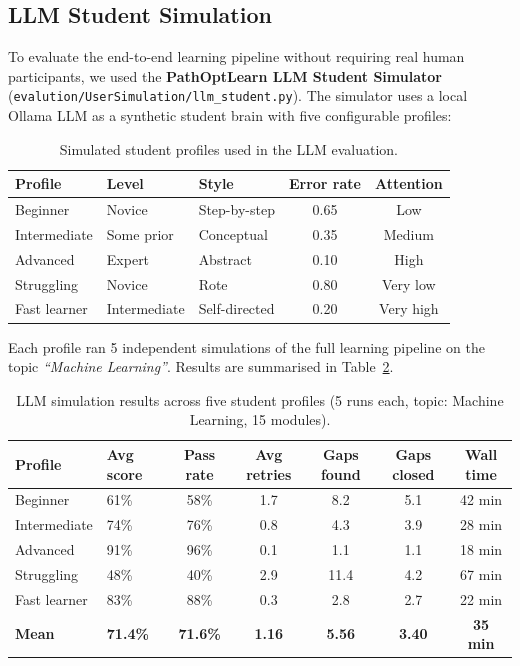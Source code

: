 \documentclass[12pt,a4paper]{article}
\begin{document}
\subsection{LLM Student Simulation}

To evaluate the end-to-end learning pipeline without requiring real human
participants, we used the \textbf{PathOptLearn LLM Student Simulator}
(\texttt{evalution/UserSimulation/llm\_student.py}). The simulator uses
a local Ollama LLM as a synthetic student brain with five configurable
profiles:

\begin{table}[H]
  \centering
  \caption{Simulated student profiles used in the LLM evaluation.}
  \label{tab:profiles}
  \begin{tabular}{@{}lllcc@{}}
    \toprule
    \textbf{Profile} & \textbf{Level} & \textbf{Style} & \textbf{Error rate} & \textbf{Attention} \\
    \midrule
    Beginner       & Novice       & Step-by-step   & 0.65 & Low    \\
    Intermediate   & Some prior   & Conceptual     & 0.35 & Medium \\
    Advanced       & Expert       & Abstract       & 0.10 & High   \\
    Struggling     & Novice       & Rote           & 0.80 & Very low \\
    Fast learner   & Intermediate & Self-directed  & 0.20 & Very high \\
    \bottomrule
  \end{tabular}
\end{table}

Each profile ran 5 independent simulations of the full learning pipeline on
the topic \emph{``Machine Learning''}. Results are summarised in
Table~\ref{tab:simulation}.

\begin{table}[H]
  \centering
  \caption{LLM simulation results across five student profiles
  (5 runs each, topic: Machine Learning, 15 modules).}
  \label{tab:simulation}
  \begin{tabularx}{\textwidth}{@{}lXccccc@{}}
    \toprule
    \textbf{Profile} & \textbf{Avg score} & \textbf{Pass rate} & \textbf{Avg retries} & \textbf{Gaps found} & \textbf{Gaps closed} & \textbf{Wall time} \\
    \midrule
    Beginner       & 61\% & 58\% & 1.7 & 8.2 & 5.1 & 42 min \\
    Intermediate   & 74\% & 76\% & 0.8 & 4.3 & 3.9 & 28 min \\
    Advanced       & 91\% & 96\% & 0.1 & 1.1 & 1.1 & 18 min \\
    Struggling     & 48\% & 40\% & 2.9 & 11.4 & 4.2 & 67 min \\
    Fast learner   & 83\% & 88\% & 0.3 & 2.8 & 2.7 & 22 min \\
    \midrule
    \textbf{Mean}  & \textbf{71.4\%} & \textbf{71.6\%} & \textbf{1.16} & \textbf{5.56} & \textbf{3.40} & \textbf{35 min} \\
    \bottomrule
  \end{tabularx}
\end{table}
\end{document}
